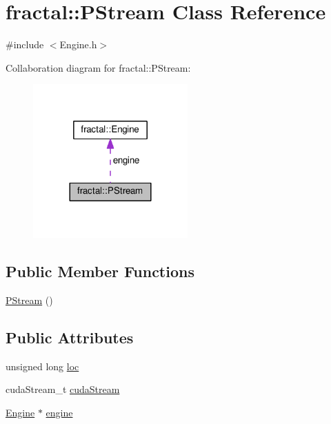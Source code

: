 \hypertarget{classfractal_1_1PStream}{\section{fractal\+:\+:P\+Stream Class Reference}
\label{classfractal_1_1PStream}
}


{\ttfamily \#include $<$Engine.\+h$>$}



Collaboration diagram for fractal\+:\+:P\+Stream\+:\nopagebreak
\begin{figure}[H]
\begin{center}
\leavevmode
\includegraphics[width=168pt]{d9/d16/classfractal_1_1PStream__coll__graph}
\end{center}
\end{figure}
\subsection*{Public Member Functions}
\begin{DoxyCompactItemize}
\item 
\hyperlink{classfractal_1_1PStream_a5b2368142135eddf580e0a742fa762fe}{P\+Stream} ()
\end{DoxyCompactItemize}
\subsection*{Public Attributes}
\begin{DoxyCompactItemize}
\item 
unsigned long \hyperlink{classfractal_1_1PStream_a552ad139e6d6591c02c86df3f94905ea}{loc}
\item 
cuda\+Stream\+\_\+t \hyperlink{classfractal_1_1PStream_a75bccf805316d8cbe246894f51d10dbc}{cuda\+Stream}
\item 
\hyperlink{classfractal_1_1Engine}{Engine} $\ast$ \hyperlink{classfractal_1_1PStream_a34e04d597a6674f08fdba4a9d548b200}{engine}
\end{DoxyCompactItemize}


